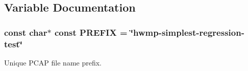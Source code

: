 \subsection{Variable Documentation}
\subsubsection[{\texorpdfstring{P\+R\+E\+F\+IX}{PREFIX}}]{\setlength{\rightskip}{0pt plus 5cm}const char$\ast$ const P\+R\+E\+F\+IX = \char`\"{}hwmp-\/simplest-\/regression-\/{\bf test}\char`\"{}}\hypertarget{hwmp-simplest-regression_8cc_a61dc66981fa47bfd0066a57a487c599c}{}\label{hwmp-simplest-regression_8cc_a61dc66981fa47bfd0066a57a487c599c}


Unique P\+C\+AP file name prefix. 

